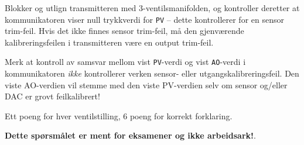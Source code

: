 \vskip 10pt

Blokker og utlign transmitteren med 3-ventilsmanifolden, og kontroller deretter at kommunikatoren viser null trykkverdi for {\tt PV} -- dette kontrollerer for en sensor trim-feil. Hvis det ikke finnes sensor trim-feil, må den gjenværende kalibreringsfeilen i transmitteren være en output trim-feil.

Merk at kontroll av samsvar mellom vist {\tt PV}-verdi og vist {\tt AO}-verdi i kommunikatoren {\it ikke} kontrollerer verken sensor- eller utgangskalibreringsfeil. Den viste AO-verdien vil stemme med den viste PV-verdien selv om sensor og/eller DAC er grovt feilkalibrert!

\vskip 10pt

Ett poeng for hver ventilstilling, 6 poeng for korrekt forklaring.







{\bf Dette spørsmålet er ment for eksamener og ikke arbeidsark!}.


